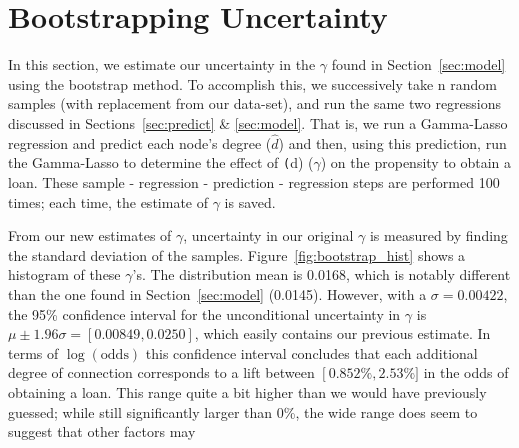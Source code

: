 \documentclass[11pt, fleqn]{article}
\begin{document}
\section{Bootstrapping Uncertainty}

In this section, we estimate our uncertainty in the $\gamma$ found in Section~\ref{sec:model} using the bootstrap method.  To accomplish this, we successively take n random samples (with replacement from our data-set), and run the same two regressions discussed in Sections~\ref{sec:predict} & \ref{sec:model}.  That is, we run a Gamma-Lasso regression and predict each node's degree ($\hat{d}$) and then, using this prediction, run the Gamma-Lasso to determine the effect of \texttt(d) ($\gamma$) on the propensity to obtain a loan.  These sample - regression - prediction - regression steps are performed 100 times; each time, the estimate of $\gamma$ is saved.

From our new estimates of $\gamma$, uncertainty in our original $\gamma$ is measured by finding the standard deviation of the samples.  Figure~\ref{fig:bootstrap_hist} shows a histogram of these $\gamma$'s.  The distribution mean is 0.0168, which is notably different than the one found in Section~\ref{sec:model} (0.0145).  However, with a $\sigma = 0.00422$, the 95\% confidence interval for the unconditional uncertainty in $\gamma$ is $\mu \pm 1.96\sigma = \left[0.00849, 0.0250\right]$, which easily contains our previous estimate.  In terms of $\log(\text{odds})$ this confidence interval concludes that each additional degree of connection corresponds to a lift between $\left[0.852\%, 2.53\%]$ in the odds of obtaining a loan.  This range quite a bit higher than we would have previously guessed; while still significantly larger than 0\%, the wide range does seem to suggest that other factors may

\end{document}
